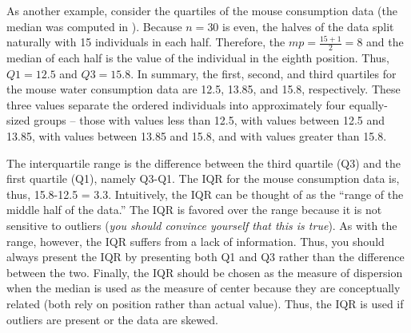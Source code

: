 \documentclass[10pt,openany]{book}\usepackage[]{graphicx}\usepackage[]{color}
\begin{document}
As another example, consider the quartiles of the mouse consumption data (the median was computed in ).  Because $n=30$ is even, the halves of the data split naturally with 15 individuals in each half.  Therefore, the $mp=\frac{15+1}{2}=8$ and the median of each half is the value of the individual in the eighth position.  Thus, $Q1=12.5$ and $Q3=15.8$.  In summary, the first, second, and third quartiles for the mouse water consumption data are 12.5, 13.85, and 15.8, respectively.  These three values separate the ordered individuals into approximately four equally-sized groups -- those with values less than 12.5, with values between 12.5 and 13.85, with values between 13.85 and 15.8, and with values greater than 15.8.


The interquartile range is the difference between the third quartile (Q3) and the first quartile (Q1), namely Q3-Q1.  The IQR for the mouse consumption data is, thus, 15.8-12.5 = 3.3.  Intuitively, the IQR can be thought of as the ``range of the middle half of the data.''  The IQR is favored over the range because it is not sensitive to outliers (\textit{you should convince yourself that this is true}).  As with the range, however, the IQR suffers from a lack of information.  Thus, you should always present the IQR by presenting both Q1 and Q3 rather than the difference between the two.  Finally, the IQR should be chosen as the measure of dispersion when the median is used as the measure of center because they are conceptually related (both rely on position rather than actual value).  Thus, the IQR is used if outliers are present or the data are skewed.


\vspace{-12pt}
\end{document}
